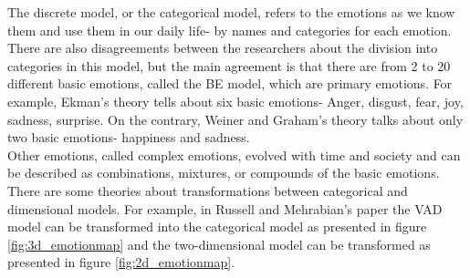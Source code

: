 \documentclass[../main.tex]{subfiles}
\begin{document}
The discrete model, or the categorical model, refers to the emotions as we know them and use 
them in our daily life- by names and categories for each emotion. 
There are also disagreements between the researchers about the division into categories in this model, 
but the main agreement is that there are from 2 to 20 different basic emotions, called the BE model,
which are primary emotions. For example, Ekman's theory \cite{Ekman_Theory} tells about 
six basic emotions- Anger, disgust, fear, joy, sadness, surprise. 
On the contrary, Weiner and Graham's \cite{WG-Theory} theory talks about only two basic emotions- happiness and sadness.\\
Other emotions, called complex emotions, evolved with time and society and can 
be described as combinations, mixtures, or compounds of the basic emotions.
There are some theories about transformations between categorical and dimensional models. 
For example, in Russell and Mehrabian's paper \cite{VAD_model} the VAD model can 
be transformed into the categorical model as presented in figure \ref{fig:3d_emotionmap}
and the two-dimensional model can be transformed as presented in figure \ref{fig:2d_emotionmap}.
\end{document}

